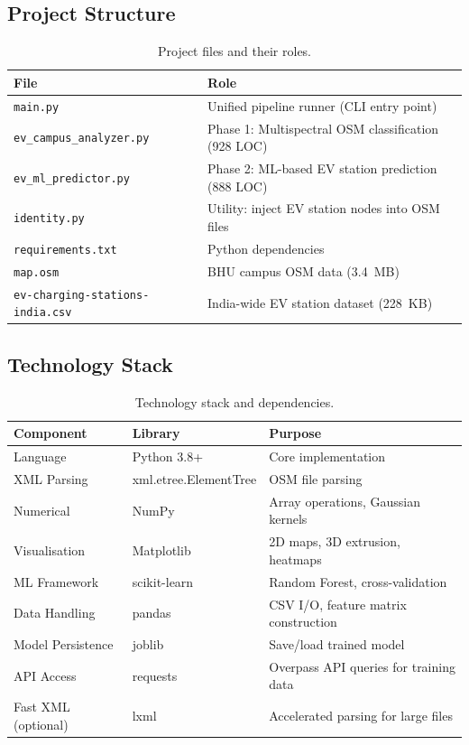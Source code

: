 \documentclass[12pt, a4paper]{article}
\begin{document}
\subsection{Project Structure}

\begin{table}[H]
\centering
\caption{Project files and their roles.}
\label{tab:project_structure}
\begin{tabular}{@{}ll@{}}
\toprule
\textbf{File} & \textbf{Role} \\
\midrule
\texttt{main.py} & Unified pipeline runner (CLI entry point) \\
\texttt{ev\_campus\_analyzer.py} & Phase 1: Multispectral OSM classification (928 LOC) \\
\texttt{ev\_ml\_predictor.py} & Phase 2: ML-based EV station prediction (888 LOC) \\
\texttt{identity.py} & Utility: inject EV station nodes into OSM files \\
\texttt{requirements.txt} & Python dependencies \\
\texttt{map.osm} & BHU campus OSM data (3.4~MB) \\
\texttt{ev-charging-stations-india.csv} & India-wide EV station dataset (228~KB) \\
\bottomrule
\end{tabular}
\end{table}

\subsection{Technology Stack}

\begin{table}[H]
\centering
\caption{Technology stack and dependencies.}
\label{tab:tech_stack}
\begin{tabular}{@{}lll@{}}
\toprule
\textbf{Component} & \textbf{Library} & \textbf{Purpose} \\
\midrule
Language & Python 3.8+ & Core implementation \\
XML Parsing & xml.etree.ElementTree & OSM file parsing \\
Numerical & NumPy & Array operations, Gaussian kernels \\
Visualisation & Matplotlib & 2D maps, 3D extrusion, heatmaps \\
ML Framework & scikit-learn & Random Forest, cross-validation \\
Data Handling & pandas & CSV I/O, feature matrix construction \\
Model Persistence & joblib & Save/load trained model \\
API Access & requests & Overpass API queries for training data \\
Fast XML (optional) & lxml & Accelerated parsing for large files \\
\bottomrule
\end{tabular}
\end{table}
\end{document}
